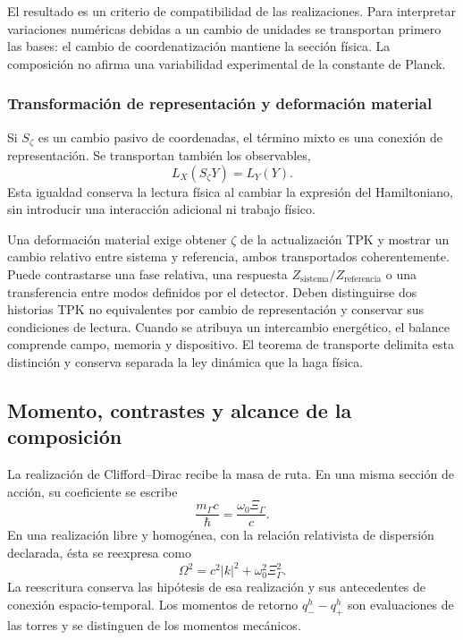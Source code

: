 El resultado es un criterio de compatibilidad de las realizaciones. Para
interpretar variaciones numéricas debidas a un cambio de unidades se
transportan primero las bases: el cambio de coordenatización mantiene la sección
física. La composición no afirma una variabilidad experimental de la
constante de Planck.

\subsubsection{Transformación de representación y deformación material}
\label{md:hib:interpretacion-transporte}

Si $S_\zeta$ es un cambio pasivo de coordenadas, el término mixto es una
conexión de representación. Se transportan también los observables,
\begin{equation}
 L_X(S_\zeta Y)=L_Y(Y).
 \label{md:hib:observables-transportados}
\end{equation}
Esta igualdad conserva la lectura física al cambiar la expresión del
Hamiltoniano, sin introducir una interacción adicional ni trabajo físico.

Una deformación material exige obtener $\zeta$ de la actualización TPK y
mostrar un cambio relativo entre sistema y referencia, ambos transportados
coherentemente. Puede contrastarse una fase relativa, una respuesta
$Z_{\mathrm{sistema}}/Z_{\mathrm{referencia}}$ o una transferencia entre
modos definidos por el detector. Deben distinguirse dos historias TPK no
equivalentes por cambio de representación y conservar sus condiciones de
lectura. Cuando se atribuya un intercambio energético, el balance comprende
campo, memoria y dispositivo. El teorema de transporte delimita esta
distinción y conserva separada la ley dinámica que la haga física.

\subsection{Momento, contrastes y alcance de la composición}
\label{md:hib:momento}

La realización de Clifford--Dirac recibe la masa de ruta. En una misma
sección de acción, su coeficiente se escribe
\begin{equation}
 \frac{m_\Gamma c}{\hbar}
 =\frac{\omega_0\Xi_\Gamma}{c}.
 \label{md:hib:coeficiente-dirac}
\end{equation}
En una realización libre y homogénea, con la relación relativista de
dispersión declarada, ésta se reexpresa como
\begin{equation}
 \Omega^2=c^2|k|^2+\omega_0^2\Xi_\Gamma^2.
 \label{md:hib:dispersion}
\end{equation}
La reescritura conserva las hipótesis de esa realización y sus antecedentes
de conexión espacio-temporal. Los momentos de retorno $q_-^h-q_+^h$
son evaluaciones de las torres y se distinguen de los momentos mecánicos.

